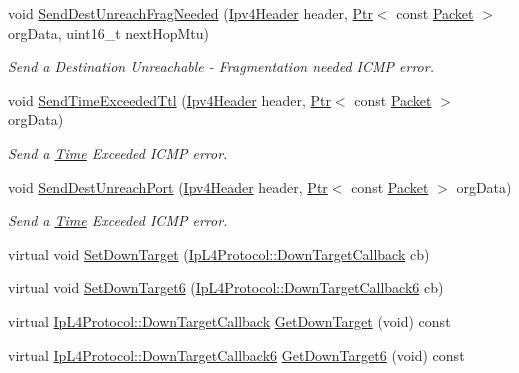 \begin{DoxyCompactItemize}
void \hyperlink{classns3_1_1Icmpv4L4Protocol_adbf949ad6ba0ca41d00a893ea70c9173}{Send\+Dest\+Unreach\+Frag\+Needed} (\hyperlink{classns3_1_1Ipv4Header}{Ipv4\+Header} header, \hyperlink{classns3_1_1Ptr}{Ptr}$<$ const \hyperlink{classns3_1_1Packet}{Packet} $>$ org\+Data, uint16\+\_\+t next\+Hop\+Mtu)
\begin{DoxyCompactList}\small\item\em Send a Destination Unreachable -\/ Fragmentation needed I\+C\+MP error. \end{DoxyCompactList}\item 
void \hyperlink{classns3_1_1Icmpv4L4Protocol_a1f4e7a86ec35cc77fbfb9bd2e6dee0f0}{Send\+Time\+Exceeded\+Ttl} (\hyperlink{classns3_1_1Ipv4Header}{Ipv4\+Header} header, \hyperlink{classns3_1_1Ptr}{Ptr}$<$ const \hyperlink{classns3_1_1Packet}{Packet} $>$ org\+Data)
\begin{DoxyCompactList}\small\item\em Send a \hyperlink{classns3_1_1Time}{Time} Exceeded I\+C\+MP error. \end{DoxyCompactList}\item 
void \hyperlink{classns3_1_1Icmpv4L4Protocol_a905a403ff0dd94b98ffe0e2df4578fbe}{Send\+Dest\+Unreach\+Port} (\hyperlink{classns3_1_1Ipv4Header}{Ipv4\+Header} header, \hyperlink{classns3_1_1Ptr}{Ptr}$<$ const \hyperlink{classns3_1_1Packet}{Packet} $>$ org\+Data)
\begin{DoxyCompactList}\small\item\em Send a \hyperlink{classns3_1_1Time}{Time} Exceeded I\+C\+MP error. \end{DoxyCompactList}\item 
virtual void \hyperlink{classns3_1_1Icmpv4L4Protocol_ada2868c6a62654e345aef3f0f0d8177f}{Set\+Down\+Target} (\hyperlink{classns3_1_1IpL4Protocol_ae3ba76c0a48fbaa90529c528a15f12b6}{Ip\+L4\+Protocol\+::\+Down\+Target\+Callback} cb)
\item 
virtual void \hyperlink{classns3_1_1Icmpv4L4Protocol_a331649ca2c085946e8a7f834efebd693}{Set\+Down\+Target6} (\hyperlink{classns3_1_1IpL4Protocol_a039f3d1883632ab922fa958fc9ecd97f}{Ip\+L4\+Protocol\+::\+Down\+Target\+Callback6} cb)
\item 
virtual \hyperlink{classns3_1_1IpL4Protocol_ae3ba76c0a48fbaa90529c528a15f12b6}{Ip\+L4\+Protocol\+::\+Down\+Target\+Callback} \hyperlink{classns3_1_1Icmpv4L4Protocol_a886e057802ebf41c2b92ce96519974bc}{Get\+Down\+Target} (void) const 
\item 
virtual \hyperlink{classns3_1_1IpL4Protocol_a039f3d1883632ab922fa958fc9ecd97f}{Ip\+L4\+Protocol\+::\+Down\+Target\+Callback6} \hyperlink{classns3_1_1Icmpv4L4Protocol_a7e8ec71edd078167ae5bfe87498396f2}{Get\+Down\+Target6} (void) const 
\end{DoxyCompactItemize}
